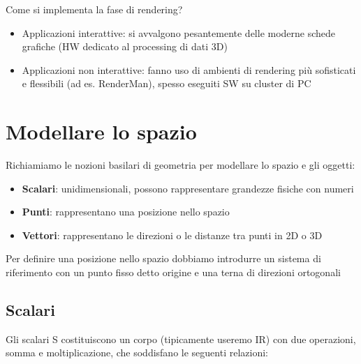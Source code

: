 \documentclass[a4paper, 10pt]{article}
\begin{document}
		Come si implementa la fase di rendering?
		\begin{itemize}
			\item Applicazioni interattive: si avvalgono pesantemente delle moderne schede grafiche (HW
				dedicato al processing di dati 3D)
			\item Applicazioni non interattive: fanno uso di ambienti di rendering più sofisticati e flessibili (ad es. RenderMan), spesso eseguiti SW su cluster di PC
		\end{itemize}
		
	\section{Modellare lo spazio}
		Richiamiamo le nozioni basilari di geometria per modellare lo
		spazio e gli oggetti:
		\begin{itemize}
			\item \textbf{Scalari}: unidimensionali, possono rappresentare grandezze fisiche
			con numeri
			\item \textbf{Punti}: rappresentano una posizione nello spazio
			\item \textbf{Vettori}: rappresentano le direzioni o le distanze tra punti in 2D o 3D
		\end{itemize}
		Per definire una posizione nello spazio dobbiamo introdurre un
		sistema di riferimento con un punto fisso detto origine e una
		terna di direzioni ortogonali
		
		\subsection{Scalari}
			Gli scalari S costituiscono un corpo (tipicamente useremo IR)
			con due operazioni, somma e moltiplicazione, che soddisfano
			le seguenti relazioni:
			
\end{document}
